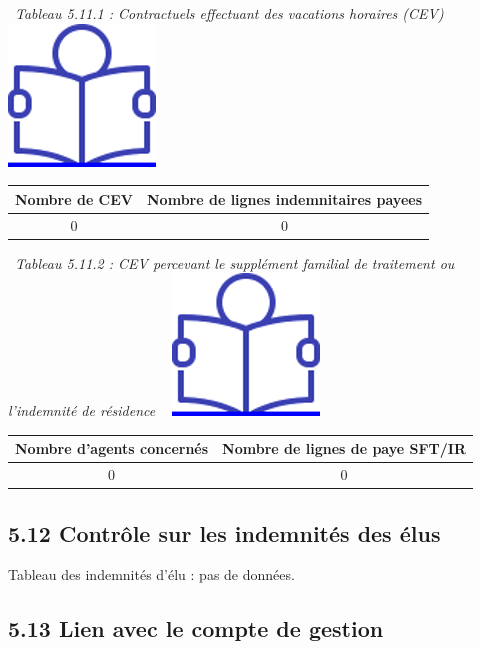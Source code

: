 ~\emph{Tableau 5.11.1 : Contractuels effectuant des vacations horaires
(CEV)} ~
\href{../Docs/Notices/fiche_CEV_horaires.odt}{\includegraphics{icones/Notice.png}}

\begin{longtable}[]{@{}cc@{}}
\toprule
Nombre de CEV & Nombre de lignes indemnitaires payees\tabularnewline
\midrule
\endhead
0 & 0\tabularnewline
\bottomrule
\end{longtable}

~\emph{Tableau 5.11.2 : CEV percevant le supplément familial de
traitement ou l'indemnité de résidence} ~
\href{../Docs/Notices/fiche_CEV_SFT.odt}{\includegraphics{icones/Notice.png}}

\begin{longtable}[]{@{}cc@{}}
\toprule
Nombre d'agents concernés & Nombre de lignes de paye
SFT/IR\tabularnewline
\midrule
\endhead
0 & 0\tabularnewline
\bottomrule
\end{longtable}

\hypertarget{controle-sur-les-indemnites-des-elus}{%
\subsection{5.12 Contrôle sur les indemnités des
élus}\label{controle-sur-les-indemnites-des-elus}}

Tableau des indemnités d'élu : pas de données.

\hypertarget{lien-avec-le-compte-de-gestion}{%
\subsection{5.13 Lien avec le compte de
gestion}\label{lien-avec-le-compte-de-gestion}}

